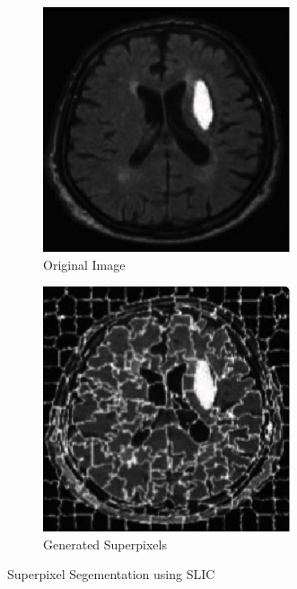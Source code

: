 \begin{figure}[htp]
    \centering
    \begin{subfigure}[b]{0.45\textwidth}
        \centering
        \includegraphics[width=0.8\textwidth]{./figures/slic-img.png}
        \caption{Original Image}
        \label{fig:slic-img}
    \end{subfigure}
    \hfill
    \begin{subfigure}[b]{0.45\textwidth}
        \centering
        \includegraphics[width=0.8\textwidth]{./figures/slic-seg.png}
        \caption{Generated Superpixels}
        \label{fig:slic-seg}
    \end{subfigure}
    \caption{Superpixel Segementation using SLIC}
    \label{fig:slic-example}
\end{figure}

